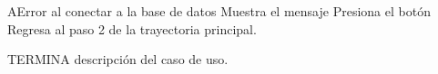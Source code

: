 			
		\begin{UCtrayectoriaA}{A}{Error al conectar a la base de datos}
			\UCpaso[\UCsist] Muestra el mensaje 
			\UCpaso[\UCactor] Presiona el botón 
			\UCpaso[\UCsist] Regresa al paso 2 de la trayectoria principal.
		\end{UCtrayectoriaA}
TERMINA descripción del caso de uso.


